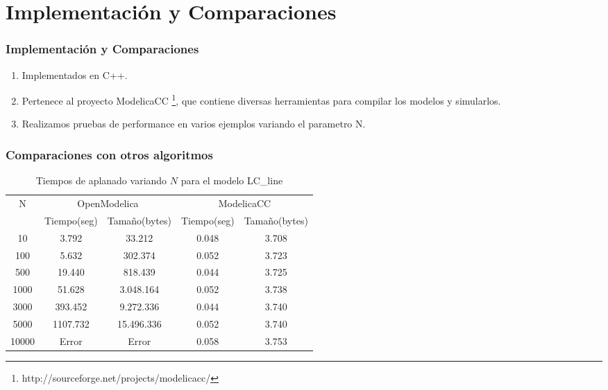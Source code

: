 \section{Implementación y Comparaciones}

\begin{frame}[fragile]
\frametitle{Implementación y Comparaciones} 
\begin{block}{}
\begin{enumerate}
\item Implementados en C++.
\item Pertenece al proyecto ModelicaCC  \footnote{http://sourceforge.net/projects/modelicacc/}, que contiene diversas herramientas para compilar los modelos y simularlos. 
\item Realizamos pruebas de performance en varios ejemplos variando el parametro N.
\end{enumerate}
\end{block}
\end{frame}

\begin{frame}[fragile]
\frametitle{Comparaciones con otros algoritmos}
\begin{table}[ht]
 \centering 
	\begin{tabular}{ | c | c | c | c | c |}
	\hline
	   N  & \multicolumn{2}{|c|}{OpenModelica} & \multicolumn{2}{|c|}{ModelicaCC} \\ \cline{2-5}
				& Tiempo(seg)	& Tamaño(bytes)	& Tiempo(seg)	& Tamaño(bytes) \\ \hline
	   10    	& 3.792  		& 33.212		& 0.048 		& 3.708		\\ \hline
	   100   	& 5.632   	 	& 302.374 		& 0.052    		& 3.723 		\\ \hline
	   500   	& 19.440 		& 818.439 		& 0.044    		& 3.725 		\\ \hline
	   1000  	& 51.628 		& 3.048.164	 	& 0.052	 		& 3.738		\\ \hline
	   3000  	& 393.452 		& 9.272.336		& 0.044	 		& 3.740		\\ \hline
	   5000  	& 1107.732 		& 15.496.336	& 0.052	 		& 3.740		\\ \hline
	   10000 	& Error			& Error			& 0.058			& 3.753		\\ \hline
	\end{tabular}	 
	\caption{Tiempos de aplanado variando $N$ para el modelo LC\_line }
\end{table}
\end{frame}

